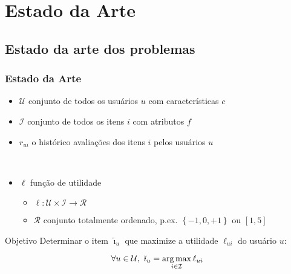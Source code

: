 \section[Estado da Arte]{Estado da Arte}
\subsection{Estado da arte dos problemas} %
\label{sub:estado_da_arte_dos_problemas}
\begin{frame}
\frametitle{Estado da Arte}
\begin{itemize}
	\item $\mathcal{U}$ conjunto de todos os usuários $u$ com características $c$
	\item $\mathcal{I}$ conjunto de todos os itens $i$ com atributos $f$
	\item $r_{ui}$ o histórico avaliações dos itens $i$ pelos usuários $u$\par{~}
	\item $\ell$ função de utilidade 
	\begin{itemize}
		\item $\ell: \mathcal{U} \times \mathcal{I} \rightarrow \mathcal{R}$
		\item $\mathcal{R}$ conjunto totalmente ordenado, p.ex. $\left\{-1, 0, +1\right\}$ ou $[1, 5]$
	\end{itemize}
\end{itemize}


\begin{block}{Objetivo}
Determinar o item $\tilde{\imath}_u$ que maximize a utilidade $\ell_{ui}$ do usuário $u$:
\end{block}

\begin{equation} 
\label{eq:utilidade}
\forall u \in \mathcal{U}, ~ \tilde{\imath}_u = \operatorname*{arg\,max}_{i \in \mathcal{I}}{\ell_{ui}}
\end{equation}

\end{frame}


